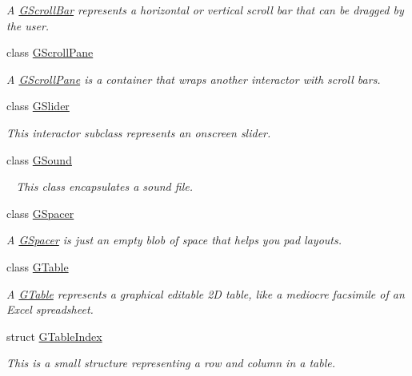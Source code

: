 \begin{DoxyCompactItemize}
\begin{DoxyCompactList}\small\item\em A \mbox{\hyperlink{classsgl_1_1GScrollBar}{G\+Scroll\+Bar}} represents a horizontal or vertical scroll bar that can be dragged by the user. \end{DoxyCompactList}\item 
class \mbox{\hyperlink{classsgl_1_1GScrollPane}{G\+Scroll\+Pane}}
\begin{DoxyCompactList}\small\item\em A \mbox{\hyperlink{classsgl_1_1GScrollPane}{G\+Scroll\+Pane}} is a container that wraps another interactor with scroll bars. \end{DoxyCompactList}\item 
class \mbox{\hyperlink{classsgl_1_1GSlider}{G\+Slider}}
\begin{DoxyCompactList}\small\item\em This interactor subclass represents an onscreen slider. \end{DoxyCompactList}\item 
class \mbox{\hyperlink{classsgl_1_1GSound}{G\+Sound}}
\begin{DoxyCompactList}\small\item\em ~\newline
 This class encapsulates a sound file. \end{DoxyCompactList}\item 
class \mbox{\hyperlink{classsgl_1_1GSpacer}{G\+Spacer}}
\begin{DoxyCompactList}\small\item\em A \mbox{\hyperlink{classsgl_1_1GSpacer}{G\+Spacer}} is just an empty blob of space that helps you pad layouts. \end{DoxyCompactList}\item 
class \mbox{\hyperlink{classsgl_1_1GTable}{G\+Table}}
\begin{DoxyCompactList}\small\item\em A \mbox{\hyperlink{classsgl_1_1GTable}{G\+Table}} represents a graphical editable 2D table, like a mediocre facsimile of an Excel spreadsheet. \end{DoxyCompactList}\item 
struct \mbox{\hyperlink{structsgl_1_1GTableIndex}{G\+Table\+Index}}
\begin{DoxyCompactList}\small\item\em This is a small structure representing a row and column in a table. \end{DoxyCompactList}\item 

\end{DoxyCompactItemize}
